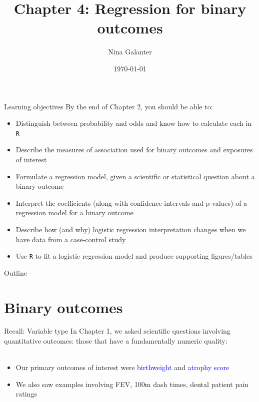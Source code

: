 \documentclass[10pt,t]{beamer}
\title{Chapter 4: Regression for binary outcomes}
\author{Nina Galanter}
\date{\today}
\begin{document}
	\begin{frame}
	\titlepage 
\end{frame}

\begin{frame}{Learning objectives}
	By the end of Chapter 2, you should be able to: 
	\begin{itemize}
		\item Distinguish between probability and odds and know how to calculate each in \texttt{R}
		\item Describe the measures of association used for binary outcomes and exposures of interest
		\item Formulate a regression model, given a scientific or statistical question about a binary outcome
		\item Interpret the coefficients (along with confidence intervals and p-values) of a regression model for a binary outcome
		\item Describe how (and why) logistic regression interpretation changes when we have data from a case-control study
		\item Use \texttt{R} to fit a logistic regression model and produce supporting figures/tables
	\end{itemize}
\end{frame}

\begin{frame}{Outline}
\tableofcontents
\end{frame}




\section{Binary outcomes}

\begin{frame}{Recall: Variable type}
	In Chapter 1, we asked scientific questions involving quantitative outcomes: those that have a fundamentally numeric quality: 
	\\~\
	
	\begin{itemize}
		\item Our primary outcomes of interest were \textcolor{blue}{birthweight} and \textcolor{blue}{atrophy score}
		\bigskip
		
		\item We also saw examples involving FEV, 100m dash times, dental patient pain ratings
	\end{itemize}
\end{frame}
\end{document}
